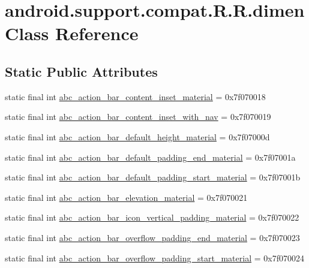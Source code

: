\hypertarget{classandroid_1_1support_1_1compat_1_1_r_1_1dimen}{
\section{android.support.compat.R.R.dimen Class Reference}
\label{classandroid_1_1support_1_1compat_1_1_r_1_1dimen}
}
\subsection*{Static Public Attributes}
\begin{CompactItemize}
\item 
static final int \hyperlink{classandroid_1_1support_1_1compat_1_1_r_1_1dimen_39b29192711b6116801b2b2c1a139247}{abc\_\-action\_\-bar\_\-content\_\-inset\_\-material} = 0x7f070018
\item 
static final int \hyperlink{classandroid_1_1support_1_1compat_1_1_r_1_1dimen_ac09b0864d8c207d384a5a0cebaa5133}{abc\_\-action\_\-bar\_\-content\_\-inset\_\-with\_\-nav} = 0x7f070019
\item 
static final int \hyperlink{classandroid_1_1support_1_1compat_1_1_r_1_1dimen_b7e0ea60a73f96330104b65f3dad8a61}{abc\_\-action\_\-bar\_\-default\_\-height\_\-material} = 0x7f07000d
\item 
static final int \hyperlink{classandroid_1_1support_1_1compat_1_1_r_1_1dimen_6d6493f0f9ade85ddc49196721dc6ddc}{abc\_\-action\_\-bar\_\-default\_\-padding\_\-end\_\-material} = 0x7f07001a
\item 
static final int \hyperlink{classandroid_1_1support_1_1compat_1_1_r_1_1dimen_81c1714dbf222c4879c01ef60eedbc54}{abc\_\-action\_\-bar\_\-default\_\-padding\_\-start\_\-material} = 0x7f07001b
\item 
static final int \hyperlink{classandroid_1_1support_1_1compat_1_1_r_1_1dimen_5fd7908f844bfb499268b0f0208f82e3}{abc\_\-action\_\-bar\_\-elevation\_\-material} = 0x7f070021
\item 
static final int \hyperlink{classandroid_1_1support_1_1compat_1_1_r_1_1dimen_175d5ac1cb859f77c0a3063f97618763}{abc\_\-action\_\-bar\_\-icon\_\-vertical\_\-padding\_\-material} = 0x7f070022
\item 
static final int \hyperlink{classandroid_1_1support_1_1compat_1_1_r_1_1dimen_ed08e753cf2276004dca8422c024f253}{abc\_\-action\_\-bar\_\-overflow\_\-padding\_\-end\_\-material} = 0x7f070023
\item 
static final int \hyperlink{classandroid_1_1support_1_1compat_1_1_r_1_1dimen_971c83f8d73a182c12d4bd1c13427e52}{abc\_\-action\_\-bar\_\-overflow\_\-padding\_\-start\_\-material} = 0x7f070024

\end{CompactItemize}
